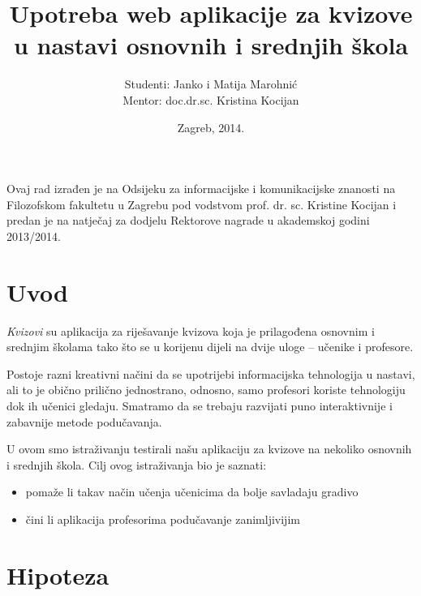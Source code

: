 \documentclass{scrreprt}
\begin{document}
\titlehead{Sveučilište u Zagrebu\\Filozofski fakultet\\Odsijek za informacijske
i komunikacijske znanosti\\Akademska godina 2013/14.}
\title{Upotreba web aplikacije za kvizove u nastavi osnovnih i srednjih škola}
\author{Studenti: Janko i Matija Marohnić\\Mentor: doc.dr.sc. Kristina Kocijan}
\date{Zagreb, 2014.}

\maketitle

\pagebreak

Ovaj rad izrađen je na Odsijeku za informacijske i komunikacijske znanosti na
Filozofskom fakultetu u Zagrebu pod vodstvom prof. dr. sc. Kristine Kocijan i
predan je na natječaj za dodjelu Rektorove nagrade u akademskoj godini
2013/2014.

\pagebreak

\tableofcontents

\chapter{Uvod}

\emph{Kvizovi} su aplikacija za riješavanje kvizova koja je prilagođena osnovnim
i srednjim školama tako što se u korijenu dijeli na dvije uloge -- učenike i
profesore.

Postoje razni kreativni načini da se upotrijebi informacijska tehnologija u
nastavi, ali to je obično prilično jednostrano, odnosno, samo profesori koriste
tehnologiju dok ih učenici gledaju. Smatramo da se trebaju razvijati puno
interaktivnije i zabavnije metode podučavanja.

U ovom smo istraživanju testirali našu aplikaciju za kvizove na nekoliko
osnovnih i srednjih škola. Cilj ovog istraživanja bio je saznati:

\begin{itemize}
  \item pomaže li takav način učenja učenicima da bolje savladaju gradivo
  \item čini li aplikacija profesorima podučavanje zanimljivijim
\end{itemize}

\chapter{Hipoteza}
\end{document}
